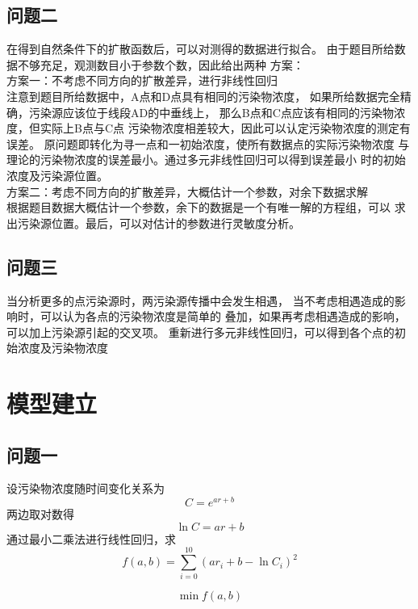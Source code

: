 \documentclass[UTF8]{ctexart}
\begin{document}
    \subsection{问题二}
      在得到自然条件下的扩散函数后，可以对测得的数据进行拟合。
      由于题目所给数据不够充足，观测数目小于参数个数，因此给出两种
      方案：\\
      方案一：不考虑不同方向的扩散差异，进行非线性回归\\
      注意到题目所给数据中，A点和D点具有相同的污染物浓度，
      如果所给数据完全精确，污染源应该位于线段AD的中垂线上，
      那么B点和C点应该有相同的污染物浓度，但实际上B点与C点
      污染物浓度相差较大，因此可以认定污染物浓度的测定有误差。
      原问题即转化为寻一点和一初始浓度，使所有数据点的实际污染物浓度
      与理论的污染物浓度的误差最小。通过多元非线性回归可以得到误差最小
      时的初始浓度及污染源位置。\\
      方案二：考虑不同方向的扩散差异，大概估计一个参数，对余下数据求解\\
      根据题目数据大概估计一个参数，余下的数据是一个有唯一解的方程组，可以
      求出污染源位置。最后，可以对估计的参数进行灵敏度分析。
    \subsection{问题三}
      当分析更多的点污染源时，两污染源传播中会发生相遇，
      当不考虑相遇造成的影响时，可以认为各点的污染物浓度是简单的
      叠加，如果再考虑相遇造成的影响，可以加上污染源引起的交叉项。
      重新进行多元非线性回归，可以得到各个点的初始浓度及污染物浓度
\newpage
\section{模型建立}
 \subsection{问题一}
   设污染物浓度随时间变化关系为
   $$ C=e^{ar+b} $$
   两边取对数得
   $$\ln{C}=ar+b$$
   通过最小二乘法进行线性回归，求
   $$f(a,b)=\sum_{i = 0}^{10}  {(ar_i+b-\ln{C_i})^2}$$
  
   $$  \min{f(a,b)}$$
   
\end{document}
